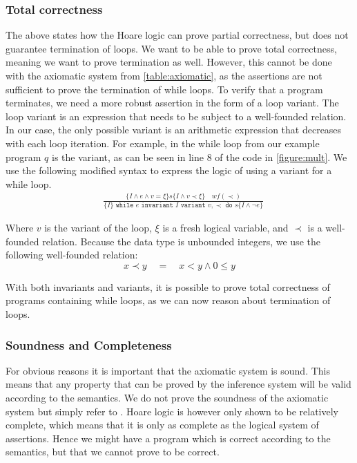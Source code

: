 \subsubsection{Total correctness}\label{sec:total-correctness}
The above states how the Hoare logic can prove partial correctness, but does not guarantee termination of loops.
We want to be able to prove total correctness, meaning we want to prove termination as well. However, this cannot be done with the axiomatic system from \cref{table:axiomatic}, as the assertions are not sufficient to prove the termination of while loops.
To verify that a program terminates, we need a more robust assertion in the form of a loop variant.
The loop variant is an expression that needs to be subject to a well-founded relation. In our case, the only possible variant is an arithmetic expression that decreases with each loop iteration. 
For example, in the while loop from our example program $q$ is the variant, as can be seen in line 8 of the code in \cref{figure:mult}.
We use the following modified syntax to express the logic of using a variant for a while loop.
\begin{equation}\label{eq:totalwhile}
\begin{align*}
  &\frac{
    \{I \land e \land v = \xi \} s \{I \land v \prec \xi \} \quad wf(\prec)
  }{
    \{I\} \texttt{ while } e \texttt{ invariant } I 
          \texttt{ variant } v, \prec \texttt{ do } s \{I \land \neg e\}
  }
\end{align*}
\end{equation}

Where $v$ is the variant of the loop, $\xi$ is a fresh logical variable, and $\prec$ is a well-founded relation. Because the data type is unbounded integers, we use the following well-founded relation\cite{wlp}:
$$x \prec y \quad = \quad x < y \land 0 \leq y $$

With both invariants and variants, it is possible to prove total correctness of programs containing while loops, as we can now reason about termination of loops.

\subsubsection{Soundness and Completeness}
For obvious reasons it is important that the axiomatic system is sound. This means that any property that can be proved by the inference system will be valid according to the semantics.
We do not prove the soundness of the axiomatic system but simply refer to \cite{nielson}.
Hoare logic is however only shown to be relatively complete\cite{cook}, which means that it is only as complete as the logical system of assertions.
Hence we might have a program which is correct according to the semantics, but that we cannot prove to be correct.
